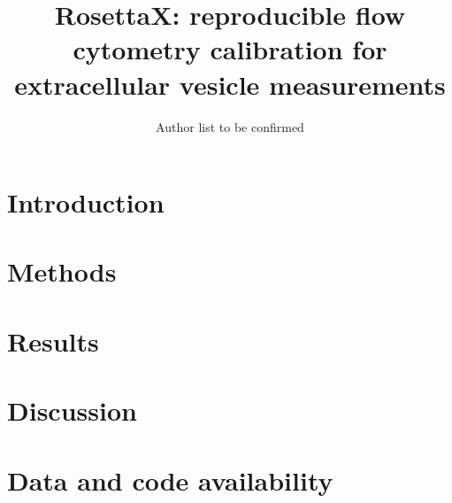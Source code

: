 \documentclass[11pt]{article}
\title{RosettaX: reproducible flow cytometry calibration for extracellular vesicle measurements}
\author{Author list to be confirmed}
\date{}
\begin{document}
\maketitle

\begin{abstract}
\end{abstract}

\section{Introduction}
\section{Methods}
\section{Results}
\section{Discussion}
\section{Data and code availability}

% 
% 
\end{document}
